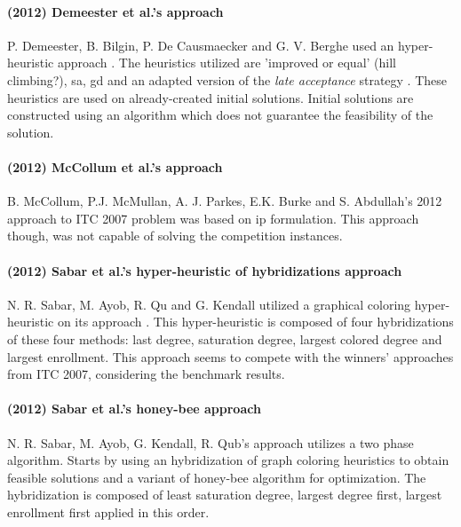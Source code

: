 \paragraph{(2012) Demeester et al.'s approach}
P. Demeester, B. Bilgin, P. De Causmaecker and G. V. Berghe used an hyper-heuristic approach \cite{Demeester2012}. The heuristics utilized are 'improved or equal' {\color{red} (hill climbing?)}, \gls{sa}, \gls{gd} and an adapted version of the \textit{late acceptance} strategy \cite{Burke2008}. These heuristics are used on already-created initial solutions. Initial solutions are constructed using an algorithm which does not guarantee the feasibility of the solution.\\

\paragraph{(2012) McCollum et al.'s approach}
B. McCollum, P.J. McMullan, A. J. Parkes, E.K. Burke and S. Abdullah's 2012 approach \cite{McCollum2012} to ITC 2007 problem was based on \gls{ip} formulation. This approach though, was not capable of solving the competition instances.\\

\paragraph{(2012) Sabar et al.'s hyper-heuristic of hybridizations approach}
N. R. Sabar, M. Ayob, R. Qu and G. Kendall utilized a graphical coloring hyper-heuristic on its approach \cite{Sabar2012}. This hyper-heuristic is composed of four hybridizations of these four methods: last degree, saturation degree, largest colored degree and largest enrollment. This approach seems to compete with the winners' approaches from ITC 2007, considering the benchmark results.\\


\paragraph{(2012) Sabar et al.'s honey-bee approach}
N. R. Sabar, M. Ayob, G. Kendall, R. Qub's approach \cite{Sabar2012a} utilizes a two phase algorithm. Starts by using an hybridization of graph coloring heuristics to obtain feasible solutions and a variant of honey-bee algorithm for optimization. The hybridization is composed of least saturation degree, largest degree first, largest enrollment first applied in this order.\\

